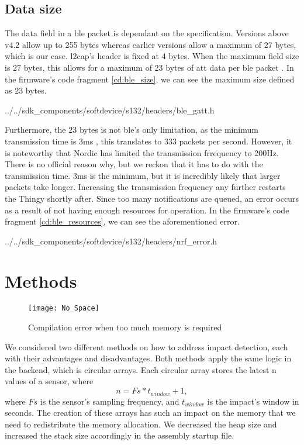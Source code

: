 \subsection{Data size}
The data field in a \gls{ble} packet is dependant on the \bt specification. Versions above v4.2 allow up to 255 bytes whereas earlier versions allow a maximum of 27 bytes, which is our case. \gls{l2cap}'s header is fixed at 4 bytes. When the maximum field size is 27 bytes, this allows for a maximum of 23 bytes of \gls{att} data per \gls{ble} packet \cite{blesize}. In the firmware's code fragment \ref{cd:ble_size}, we can see the maximum size defined as 23 bytes.


{../../sdk_components/softdevice/s132/headers/ble_gatt.h}


Furthermore, the 23 bytes is not \gls{ble}'s only limitation, as the minimum transmission time is 3ms \cite{bletime}, this translates to 333 packets per second. However, it is noteworthy that Nordic has limited the transmission frrequency to 200Hz. There is no official reason why, but we reckon that it has to do with the transmission time. 3ms is the minimum, but it is incredibly likely that larger packets take longer. Increasing the transmission frequency any further restarts the Thingy shortly after. Since too many notifications are queued, an error occurs as a result of not having enough resources for operation. In the firmware's code fragment \ref{cd:ble_resources}, we can see the aforementioned error.


{../../sdk_components/softdevice/s132/headers/nrf_error.h}

\section{Methods}\label{sc:methods}
\begin{figure}[hbt!]
	\centering
	\texttt{[image: No\_Space]}
	\caption{Compilation error when too much memory is required}
	\label{fig:no_space}
\end{figure}
We considered two different methods on how to address impact detection, each with their advantages and disadvantages. Both methods apply the same logic in the backend, which is circular arrays. Each circular array stores the latest n values of a sensor, where
\begin{equation}\label{eq:array_samples}
	n = Fs * t_{window} + 1,
\end{equation}
where $Fs$ is the sensor's sampling frequency, and $t_{window}$ is the impact's window in seconds. The creation of these arrays has such an impact on the memory that we need to redistribute the memory allocation. We decreased the heap size and increased the stack size accordingly in the assembly startup file.


